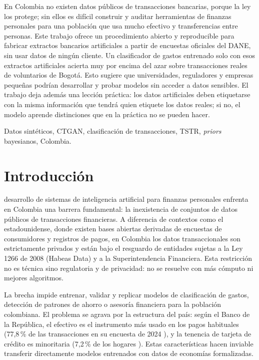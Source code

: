 \documentclass[journal]{IEEEtai}
\begin{document}
\begin{IEEEImpStatement}
En Colombia no existen datos públicos de transacciones bancarias, porque la ley los protege; sin ellos es difícil construir y auditar herramientas de finanzas personales para una población que usa mucho efectivo y transferencias entre personas. Este trabajo ofrece un procedimiento abierto y reproducible para fabricar extractos bancarios artificiales a partir de encuestas oficiales del DANE, sin usar datos de ningún cliente. Un clasificador de gastos entrenado solo con esos extractos artificiales acierta muy por encima del azar sobre transacciones reales de voluntarios de Bogotá. Esto sugiere que universidades, reguladores y empresas pequeñas podrían desarrollar y probar modelos sin acceder a datos sensibles. El trabajo deja además una lección práctica: los datos artificiales deben etiquetarse con la misma información que tendrá quien etiquete los datos reales; si no, el modelo aprende distinciones que en la práctica no se pueden hacer.
\end{IEEEImpStatement}

\begin{IEEEkeywords}
Datos sintéticos, CTGAN, clasificación de transacciones, TSTR, \textit{priors} bayesianos, Colombia.
\end{IEEEkeywords}

\section{Introducción}
 desarrollo de sistemas de inteligencia artificial para finanzas personales enfrenta en Colombia una barrera fundamental: la inexistencia de conjuntos de datos públicos de transacciones financieras. A diferencia de contextos como el estadounidense, donde existen bases abiertas derivadas de encuestas de consumidores y registros de pagos, en Colombia los datos transaccionales son estrictamente privados y están bajo el resguardo de entidades sujetas a la Ley 1266 de 2008 (Habeas Data) y a la Superintendencia Financiera. Esta restricción no es técnica sino regulatoria y de privacidad: no se resuelve con más cómputo ni mejores algoritmos.

La brecha impide entrenar, validar y replicar modelos de clasificación de gastos, detección de patrones de ahorro o asesoría financiera para la población colombiana. El problema se agrava por la estructura del país: según el Banco de la República, el efectivo es el instrumento más usado en los pagos habituales (77{,}8\,\% de las transacciones en su encuesta de 2024 \cite{banrep2024}), y la tenencia de tarjeta de crédito es minoritaria (7{,}2\,\% de los hogares \cite{rif2024}). Estas características hacen inviable transferir directamente modelos entrenados con datos de economías formalizadas.
\end{document}
